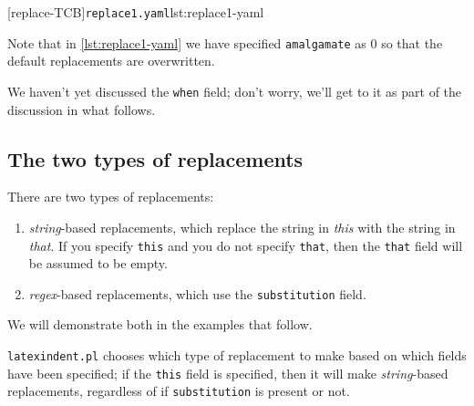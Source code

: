  \begin{cmhtcbraster}[raster column skip=.01\linewidth]
  [replace-TCB]{\texttt{replace1.yaml}}{lst:replace1-yaml}
 \end{cmhtcbraster}

 Note that in \cref{lst:replace1-yaml} we have specified \texttt{amalgamate} as 0 so that
 the default replacements are overwritten.

 We haven't yet discussed the \texttt{when} field; don't worry, we'll get to it as part of
 the discussion in what follows.

\subsection{The two types of replacements}
 There are two types of replacements:
 \begin{enumerate}
  \item \emph{string}-based replacements, which replace the string in
        \emph{this} with the string in \emph{that}.
        If you specify \texttt{this} and you do not specify \texttt{that}, then the \texttt{that}
        field will be assumed to be empty.
  \item \emph{regex}-based replacements, which use the \texttt{substitution} field.
 \end{enumerate}
 We will demonstrate both in the examples that follow.

 \texttt{latexindent.pl} chooses which type of replacement to make based on which fields
 have been specified; if the \texttt{this} field is specified, then it will make
 \emph{string}-based replacements, regardless of if \texttt{substitution} is present or
 not.

